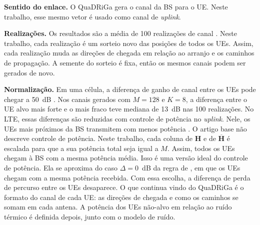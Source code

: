 \textbf{Sentido do enlace.} O QuaDRiGa gera o canal da BS para o UE. Neste trabalho, esse mesmo vetor é usado como canal de \textit{uplink}.

\textbf{Realizações.} Os resultados são a média de 100 realizações de canal \cite{zhao-lmmse}. Neste trabalho, cada realização é um sorteio novo das posições de todos os UEs. Assim, cada realização muda as direções de chegada em relação ao arranjo e os caminhos de propagação. A semente do sorteio é fixa, então os mesmos canais podem ser gerados de novo.

\textbf{Normalização.} Em uma célula, a diferença de ganho de canal entre os UEs pode chegar a 50~dB \cite[p.~311]{bjornson-mimo}. Nos canais gerados com $M=128$ e $K=8$, a diferença entre o UE alvo mais forte e o mais fraco teve mediana de 13~dB nas 100 realizações. No LTE, essas diferenças são reduzidas com controle de potência no \textit{uplink}. Nele, os UEs mais próximos da BS transmitem com menos potência \cite[p.~311]{bjornson-mimo}. O artigo base não descreve controle de potência. Neste trabalho, cada coluna de $\mathbf{H}$ e de $\overline{\mathbf{H}}$ é escalada para que a sua potência total seja igual a $M$. Assim, todos os UEs chegam à BS com a mesma potência média. Isso é uma versão ideal do controle de potência. Ela se aproxima do caso $\Delta = 0$~dB da regra de , em que os UEs chegam com a mesma potência recebida. Com essa escolha, a diferença de perda de percurso entre os UEs desaparece. O que continua vindo do QuaDRiGa é o formato do canal de cada UE: as direções de chegada e como os caminhos se somam em cada antena. A potência dos UEs não-alvo em relação ao ruído térmico é definida depois, junto com o modelo de ruído.


